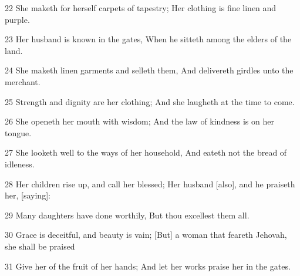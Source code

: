\par 22 She maketh for herself carpets of tapestry; Her clothing is fine linen and purple.
\par 23 Her husband is known in the gates, When he sitteth among the elders of the land.
\par 24 She maketh linen garments and selleth them, And delivereth girdles unto the merchant.
\par 25 Strength and dignity are her clothing; And she laugheth at the time to come.
\par 26 She openeth her mouth with wisdom; And the law of kindness is on her tongue.
\par 27 She looketh well to the ways of her household, And eateth not the bread of idleness.
\par 28 Her children rise up, and call her blessed; Her husband [also], and he praiseth her, [saying]:
\par 29 Many daughters have done worthily, But thou excellest them all.
\par 30 Grace is deceitful, and beauty is vain; [But] a woman that feareth Jehovah, she shall be praised
\par 31 Give her of the fruit of her hands; And let her works praise her in the gates.

